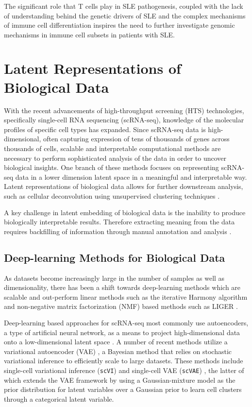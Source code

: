 The significant role that T cells play in SLE pathogenesis, coupled with the lack of understanding behind the genetic drivers of SLE and the complex mechanisms of immune cell differentiation inspires the need to further investigate genomic mechanisms in immune cell subsets in patients with SLE.

\newpage
\section{Latent Representations of Biological Data} 

With the recent advancements of high-throughput screening (HTS) technologies, specifically single-cell RNA sequencing (scRNA-seq), knowledge of the molecular profiles of specific cell types has expanded. Since scRNA-seq data is high-dimensional, often capturing expression of tens of thousands of genes across thousands of cells, scalable and interpretable computational methods are necessary to perform sophisticated analysis of the data in order to uncover biological insights. One branch of these methods focuses on representing scRNA-seq data in a lower dimension latent space in a meaningful and interpretable way. Latent representations of biological data allows for further downstream analysis, such as cellular deconvolution using unsupervised clustering techniques \cite{Luecken_2019}. 

A key challenge in latent embedding of biological data is the inability to produce biologically interpretable results. Therefore extracting meaning from the data requires backfilling of information through manual annotation and analysis \cite{Kiselev_2019}.

\subsection{Deep-learning Methods for Biological Data} 

As datasets become increasingly large in the number of samples as well as dimensionality, there has been a shift towards deep-learning methods which are scalable and out-perform linear methods such as the iterative Harmony algorithm \cite{korsunsky2019fast} and non-negative matrix factorization (NMF) based methods such as LIGER \cite{liu2020jointly}.

Deep-learning based approaches for scRNA-seq most commonly use autoencoders, a type of artificial neural network, as a means to project high-dimensional data onto a low-dimensional latent space \cite{tschannen2018recent}. A number of recent methods utilize a variational autoencoder (VAE) \cite{Kingma2013-if}, a Bayesian method that relies on stochastic variational inference to efficiently scale to large datasets. These methods include single-cell variational inference (\texttt{scVI}) \cite{scvi} and single-cell VAE (\texttt{scVAE}) \cite{gronbech2020scvae}, the latter of which extends the VAE framework by using a Gaussian-mixture model as the prior distribution for latent variables over a Gaussian prior to learn cell clusters through a categorical latent variable.

